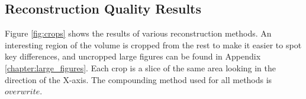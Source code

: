 \subsection{Reconstruction Quality Results}
	
	Figure \ref{fig:crops} shows the results of various reconstruction methods. An interesting region of the volume is cropped from the rest to make it easier to spot key differences, and uncropped large figures can be found in Appendix \ref{chapter:large_figures}. Each crop is a slice of the same area looking in the direction of the X-axis. The compounding method used for all methods is $overwrite$.
	
